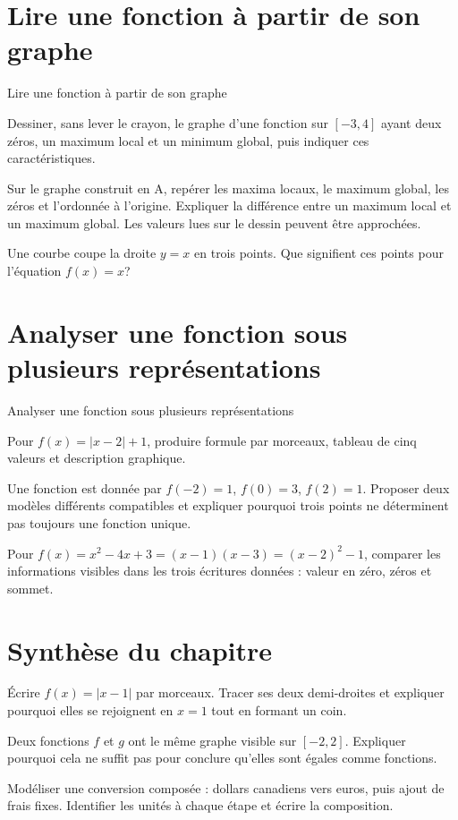 \section{Lire une fonction à partir de son graphe}
\label{workbook:section:03.07}
\begin{exerciseblock}{Lire une fonction à partir de son graphe}
\item Dessiner, sans lever le crayon, le graphe d'une fonction sur \([-3,4]\) ayant deux zéros, un maximum local et un minimum global, puis indiquer ces caractéristiques.
\item Sur le graphe construit en A, repérer les maxima locaux, le maximum global, les zéros et l'ordonnée à l'origine. Expliquer la différence entre un maximum local et un maximum global. Les valeurs lues sur le dessin peuvent être approchées.
\item Une courbe coupe la droite $y=x$ en trois points. Que signifient ces points pour l'équation $f(x)=x$?
\end{exerciseblock}
\section{Analyser une fonction sous plusieurs représentations}
\label{workbook:section:03.08}
\begin{exerciseblock}{Analyser une fonction sous plusieurs représentations}
\item Pour $f(x)=|x-2|+1$, produire formule par morceaux, tableau de cinq valeurs et description graphique.
\item Une fonction est donnée par $f(-2)=1$, $f(0)=3$, $f(2)=1$. Proposer deux modèles différents compatibles et expliquer pourquoi trois points ne déterminent pas toujours une fonction unique.
\item Pour \(f(x)=x^2-4x+3=(x-1)(x-3)=(x-2)^2-1\), comparer les informations visibles dans les trois écritures données : valeur en zéro, zéros et sommet.
\end{exerciseblock}
\section*{Synthèse du chapitre}
\begin{synthesisbox}
\item Écrire \(f(x)=|x-1|\) par morceaux. Tracer ses deux demi-droites et expliquer pourquoi elles se rejoignent en \(x=1\) tout en formant un coin.
\item Deux fonctions $f$ et $g$ ont le même graphe visible sur $[-2,2]$. Expliquer pourquoi cela ne suffit pas pour conclure qu'elles sont égales comme fonctions.
\item Modéliser une conversion composée : dollars canadiens vers euros, puis ajout de frais fixes. Identifier les unités à chaque étape et écrire la composition.
\end{synthesisbox}
